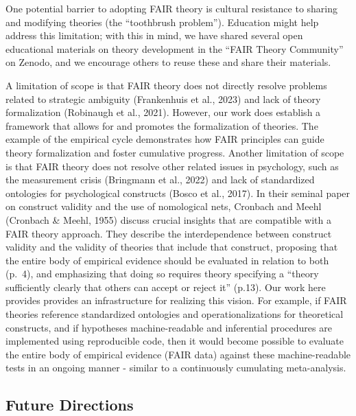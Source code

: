 \documentclass[
  man, noextraspace,floatsintext]{apa7}
\begin{document}
One potential barrier to adopting FAIR theory is cultural resistance to sharing and modifying theories (the ``toothbrush problem'').
Education might help address this limitation; with this in mind,
we have shared several open educational materials on theory development in the ``FAIR Theory Community'' on Zenodo, and we encourage others to reuse these and share their materials.

A limitation of scope is that FAIR theory does not directly resolve problems related to strategic ambiguity (Frankenhuis et al., 2023) and lack of theory formalization (Robinaugh et al., 2021).
However, our work does establish a framework that allows for and promotes the formalization of theories.
The example of the empirical cycle demonstrates how FAIR principles can guide theory formalization and foster cumulative progress.
Another limitation of scope is that FAIR theory does not resolve other related issues in psychology, such as the measurement crisis (Bringmann et al., 2022) and lack of standardized ontologies for psychological constructs (Bosco et al., 2017).
\label{nomological}{In their seminal paper on construct validity and the use of nomological nets, Cronbach and Meehl (Cronbach \& Meehl, 1955) discuss crucial insights that are compatible with a FAIR theory approach.
They describe the interdependence between construct validity and the validity of theories that include that construct,
proposing that the entire body of empirical evidence should be evaluated in relation to both (p.~4),
and emphasizing that doing so requires theory specifying a ``theory sufficiently clearly that others can accept or reject it'' (p.13).
Our work here provides provides an infrastructure for realizing this vision.
For example, if FAIR theories reference standardized ontologies and operationalizations for theoretical constructs,
and if hypotheses machine-readable and inferential procedures are implemented using reproducible code,
then it would become possible to evaluate the entire body of empirical evidence (FAIR data) against these machine-readable tests in an ongoing manner - similar to a continuously cumulating meta-analysis.}

\subsection{Future Directions}\label{future-directions}
\end{document}

